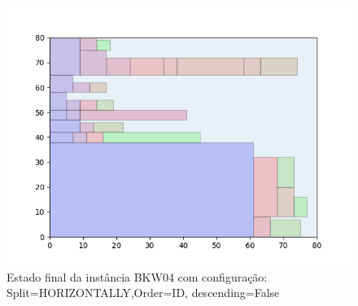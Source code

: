 \begin{figure}[H]
    \centering
    \caption[]{Estado final da instância BKW04 com configuração: Split=HORIZONTALLY,Order=ID, descending=False}
    \label{fig:bkw04-horizontally-id-false}
    \includegraphics[scale=0.5]{output/figures/bkw/bkw04/horizontally/id/false/00}
\end{figure}